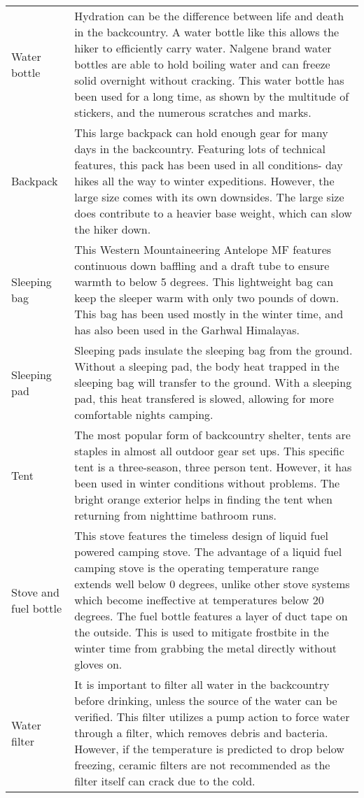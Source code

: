 \documentclass[11pt]{article}
\begin{document}
\begin{center}
\begin{longtable}{>{\raggedleft\arraybackslash}p{1in} >{\raggedright\arraybackslash}p{5.5in}}
		Water bottle & Hydration can be the difference between life and death in the backcountry. A water bottle like this allows the hiker to efficiently carry water. Nalgene brand water bottles are able to hold boiling water and can freeze solid overnight without cracking. This water bottle has been used for a long time, as shown by the multitude of stickers, and the numerous scratches and marks.\\
		Backpack & This large backpack can hold enough gear for many days in the backcountry. Featuring lots of technical features, this pack has been used in all conditions- day hikes all the way to winter expeditions. However, the large size comes with its own downsides. The large size does contribute to a heavier base weight, which can slow the hiker down.\\
		Sleeping bag & This Western Mountaineering Antelope MF features continuous down baffling and a draft tube to ensure warmth to below 5 degrees. This lightweight bag can keep the sleeper warm with only two pounds of down. This bag has been used mostly in the winter time, and has also been used in the Garhwal Himalayas.\\
		Sleeping pad & Sleeping pads insulate the sleeping bag from the ground. Without a sleeping pad, the body heat trapped in the sleeping bag will transfer to the ground. With a sleeping pad, this heat transfered is slowed, allowing for more comfortable nights camping.\\
		Tent & The most popular form of backcountry shelter, tents are staples in almost all outdoor gear set ups. This specific tent is a three-season, three person tent. However, it has been used in winter conditions without problems. The bright orange exterior helps in finding the tent when returning from nighttime bathroom runs.\\
		Stove and fuel bottle & This stove features the timeless design of liquid fuel powered camping stove. The advantage of a liquid fuel camping stove is the operating temperature range extends well below 0 degrees, unlike other stove systems which become ineffective at temperatures below 20 degrees. The fuel bottle features a layer of duct tape on the outside. This is used to mitigate frostbite in the winter time from grabbing the metal directly without gloves on.\\
		Water filter & It is important to filter all water in the backcountry before drinking, unless the source of the water can be verified. This filter utilizes a pump action to force water through a filter, which removes debris and bacteria. However, if the temperature is predicted to drop below freezing, ceramic filters are not recommended as the filter itself can crack due to the cold.\\

\end{longtable}
\end{center}
\end{document}

